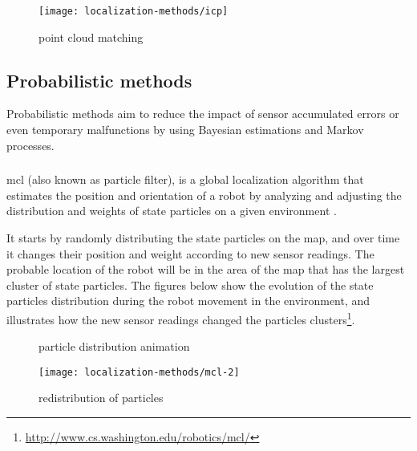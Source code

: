 \begin{figure}[H]
	\centering
	\texttt{[image: localization-methods/icp]}
	\caption[ point cloud matching]{ point cloud matching\protect\footnotemark}
	\label{fig:localization-methods_icp}
\end{figure}


\subsection{Probabilistic methods}

Probabilistic methods aim to reduce the impact of sensor accumulated errors or even temporary malfunctions by using Bayesian estimations and Markov processes.


\subsubsection{}

\gls{mcl} (also known as particle filter), is a global localization algorithm that estimates the position and orientation of a robot by analyzing and adjusting the distribution and weights of state particles on a given environment \cite{Bshara2010,Arulampalam2002,Blanco2010,Chen2003b,Fox1999,Saito2009}.

It starts by randomly distributing the state particles on the map, and over time it changes their position and weight according to new sensor readings. The probable location of the robot will be in the area of the map that has the largest cluster of state particles. The figures below show the evolution of the state particles distribution during the robot movement in the environment, and illustrates how the new sensor readings changed the particles clusters\footnote{\url{http://www.cs.washington.edu/robotics/mcl/}}.

\begin{figure}[H]
	\centering
	\begin{minipage}[h]{.49\textwidth}
		\centering
		\caption{ particle distribution animation}
		\label{fig:localization-methods_mcl1}
	\end{minipage}\hfill
	\begin{minipage}[h]{.49\textwidth}
		\centering
		\texttt{[image: localization-methods/mcl-2]}
		\caption{ redistribution of particles}
		\label{fig:localization-methods_mcl2}
	\end{minipage}
\end{figure}

